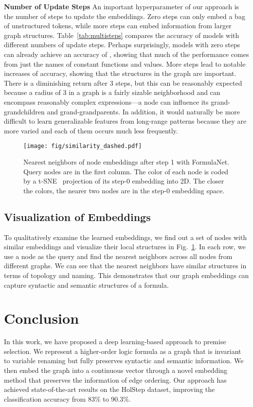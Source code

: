 \documentclass{article}
\begin{document}
\noindent \textbf{Number of Update Steps}
An important hyperparameter of our approach is the number of steps to update the
embeddings. Zero steps can only embed a bag of unstructured tokens, while more steps can
embed information from larger graph structures. Table~\ref{tab:multisteps} compares the accuracy of models with different numbers of
update steps. Perhaps surprisingly, models with zero steps can already achieve an accuracy of 
, showing that much of the performance comes from just the names of 
constant functions and values. More steps lead to notable increases of accuracy, showing that the
structures in the graph are important. There is a diminishing return after 3 steps, but
this can be reasonably expected because a
radius of 3 in a graph is a fairly sizable neighborhood and can encompass reasonably complex
expressions---a node can influence its grand-grandchildren and
grand-grandparents. In addition, it would naturally be more difficult to learn generalizable
features from long-range patterns because they are more varied and each of them occurs
much less frequently. 

\begin{figure}[b]
	\centering
	\texttt{[image: fig/similarity\_dashed.pdf]}
	\caption{Nearest neighbors of
          node embeddings after step 1 with FormulaNet. Query nodes are in the first
          column. The color of each node is coded by a t-SNE~\cite{maaten2008visualizing} projection of its
          step-0 embedding into  2D. The closer the colors,  the nearer two nodes are in
          the step-0 embedding space. }
	\label{fig:nearestneighbor}
	\vspace{-4mm}
\end{figure}
\subsection{Visualization of Embeddings}

To qualitatively examine the learned embeddings, we find out a set of nodes with
similar embeddings and visualize their local structures in
Fig.~\ref{fig:nearestneighbor}. In each row, we use a node as the query and find the
nearest neighbors across all nodes from different graphs. We can see that the nearest neighbors have similar
structures in terms of topology and naming. This demonstrates that our
graph embeddings can capture syntactic and semantic structures of a formula. 



\section{Conclusion}
In this work, we have proposed a deep learning-based approach to premise selection. We represent a higher-order logic formula
as a graph that is invariant to variable renaming but fully preserves syntactic and
semantic information. We then embed the graph into a continuous vector through a novel
embedding method that preserves the information of edge ordering. Our approach has achieved
 state-of-the-art results on the HolStep dataset, improving the classification accuracy from 83\% to 90.3\%.
\end{document}
